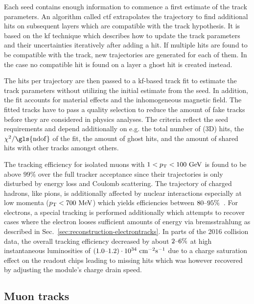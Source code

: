 Each seed contains enough information to commence a first estimate of the track parameters. An algorithm called \gls{ctf} extrapolates the trajectory to find additional hits on subsequent layers which are compatible with the track hypothesis. It is based on the \gls{kf} technique which describes how to update the track parameters and their uncertainties iteratively after adding a hit. If multiple hits are found to be compatible with the track, new trajectories are generated for each of them. In the case no compatible hit is found on a layer a ghost hit is created instead.

The hits per trajectory are then passed to a \gls{kf}-based track fit to estimate the track parameters without utilizing the initial estimate from the seed. In addition, the fit accounts for material effects and the inhomogeneous magnetic field.  The fitted tracks have to pass a quality selection to reduce the amount of fake tracks before they are considered in physics analyses. The criteria reflect the seed requirements and depend additionally on e.g. the total number of (3D) hits, the $\chi^2/\mathrm{\gls{ndof}}$ of the fit, the amount of ghost hits, and the amount of shared hits with other tracks amongst others.

The tracking efficiency for isolated muons with $1<p_\mathrm{T}<100~\mathrm{GeV}$ is found to be above $99\%$ over the full tracker acceptance since their trajectories is only disturbed by energy loss and Coulomb scattering. The trajectory of charged hadrons, like pions, is additionally affected by nuclear interactions especially at low momenta ($p_\mathrm{T}<700~\mathrm{MeV}$) which yields efficiencies between $80\text{--}95\%$~\cite{Chatrchyan:2014fea}. For electrons, a special tracking is performed additionally which attempts to recover cases where the electron looses sufficient amounts of energy via bremsstrahlung as described in Sec.~\ref{sec:reconstruction-electrontracks}. In parts of the 2016 collision data, the overall tracking efficiency decreased by about $2\text{--}6\%$ at high instantaneous luminosities of $(1.0\text{--}1.2)\cdot10^{34}~\mathrm{cm}^{-2}\mathrm{s}^{-1}$ due to a charge saturation effect on the readout chips leading to missing hits which was however recovered by adjusting the module's charge drain speed.

\subsection{Muon tracks}

